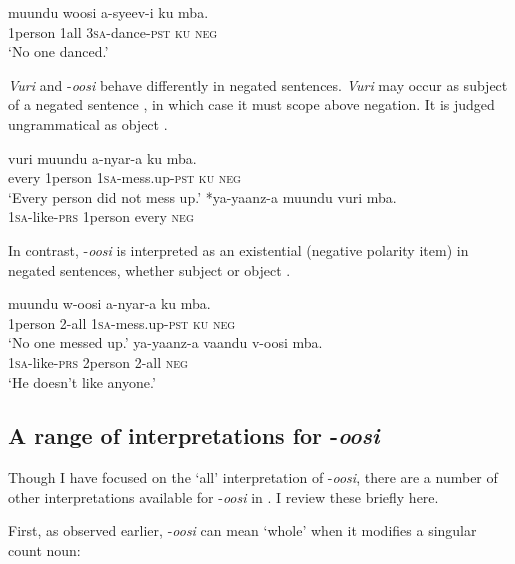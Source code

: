 \documentclass[output=paper]{langsci/langscibook}
\begin{document}
\ea\label{ex:landman:28}
\gll muundu   woosi  a-syeev-i    ku  mba.\\
     1person\textsc{}    1all    3\textsc{sa}-dance-\textsc{pst}  \textsc{ku}  \textsc{neg} \\
\glt ‘No one danced.’
\z

  \textit{Vuri} and -\textit{oosi} behave differently in negated sentences. \textit{Vuri} may occur as subject of a negated sentence , in which case it must scope above negation. It is judged ungrammatical as object .

\ea\label{ex:landman:29} 
\ea\label{ex:landman:29a}
\gll vuri  muundu  a-nyar-a    ku  mba.  \\
     every  1person  1\textsc{sa}-mess.up-\textsc{pst}  \textsc{ku}  \textsc{neg}\\
\glt ‘Every person did not mess up.’        
\ex\label{ex:landman:29b}
\gll \textup{*}ya-yaanz-a  muundu   vuri    mba. \\
     1\textsc{sa}-like-\textsc{prs}  1person     every    \textsc{neg}\\
\z
\z

  In contrast, -\textit{oosi} is interpreted as an existential (negative polarity item) in negated sentences, whether subject  or object .

\ea\label{ex:landman:30} 
\ea\label{ex:landman:30a}
\gll muundu  w-oosi    a-nyar-a    ku  mba.  \\
     1person  2-all    1\textsc{sa}-mess.up-\textsc{pst}  \textsc{ku}  \textsc{neg}\\
\glt ‘No one messed up.’        
\ex\label{ex:landman:30b}
\gll ya-yaanz-a  vaandu   v-oosi    mba. \\
     1\textsc{sa}-like-\textsc{prs}  2person     2-all    \textsc{neg}\\
\glt ‘He doesn't like anyone.’
\z
\z

\subsection{A range of interpretations for -\textit{oosi}}\label{sec:landman:4.3}

Though I have focused on the ‘all’ interpretation of -\textit{oosi}, there are a number of other interpretations available for -\textit{oosi} in . I review these briefly here.

  First, as observed earlier, -\textit{oosi} can mean ‘whole’ when it modifies a singular count noun:
\end{document}
